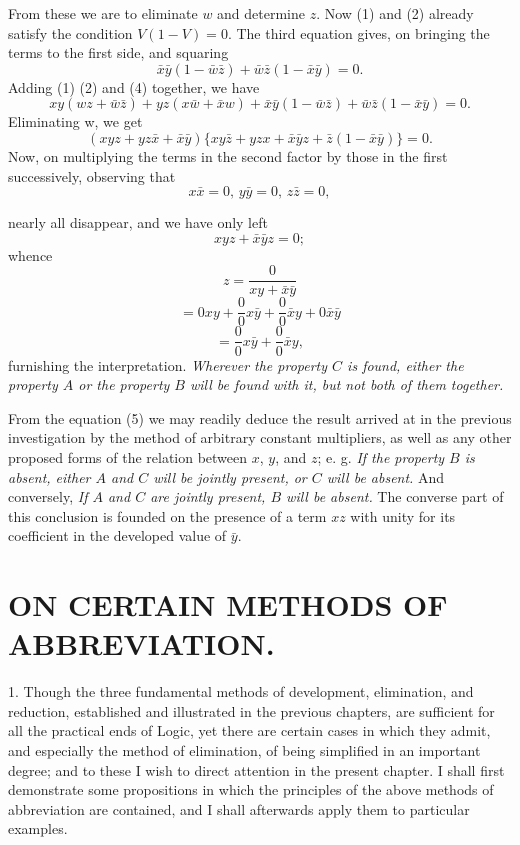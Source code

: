 \documentclass[oneside]{book}
\begin{document}
From these we are to eliminate $w$ and determine $z$. Now (1)
and (2) already satisfy the condition $V(1 - V) = 0$. The third
equation gives, on bringing the terms to the first side, and
squaring
\begin{equation}
\bar{x}\bar{y} (1 -\bar{w}\bar{z}) + \bar{w}\bar{z}(1 - \bar{x}\bar{y}) = 0.
\end{equation}
Adding (1) (2) and (4) together, we have
\[
xy(wz + \bar{w}\bar{z}) + yz(x\bar{w} +\bar{x}w)+\bar{x}\bar{y}(1 - \bar{w}\bar{z}) + \bar{w}\bar{z}(1 - \bar{x}\bar{y}) = 0.
 \]
Eliminating w, we get
\[
(xyz + yz\bar{x} + \bar{x}\bar{y}) \{xy\bar{z} + yzx + \bar{x}\bar{y}z + \bar{z}(1 - \bar{x}\bar{y})\} = 0.
\]
Now, on multiplying the terms in the second factor by those in
the first successively, observing that
\[
x\bar{x} = 0\textrm{, }y\bar{y} = 0\textrm{, }z\bar{z} = 0,
\]

nearly all disappear, and we have only left
\begin{equation}
xyz + \bar{x}\bar{y}z = 0;
\end{equation}
whence
\[
z = \frac{0}{xy+\bar{x}\bar{y}}
\]
\[
= 0xy + \frac{0}{0}x\bar{y} + \frac{0}{0}\bar{x}y + 0\bar{x}\bar{y}
\]
\[
= \frac{0}{0}x\bar{y} + \frac{0}{0}\bar{x}y,
\]
furnishing the interpretation. \textit{Wherever the property $C$ is found,
either the property $A$ or the property $B$ will be found with it, but
not both of them together.}

From the equation (5) we may readily deduce the result arrived
at in the previous investigation by the method of arbitrary
constant multipliers, as well as any other proposed forms of the
relation between $x$, $y$, and $z$; e. g. \textit{If the property $B$ is absent,
either $A$ and $C$ will be jointly present, or $C$ will be absent.} And
conversely, \textit{If $A$ and $C$ are jointly present, $B$ will be absent.}
The converse part of this conclusion is founded on the presence
of a term $xz$ with unity for its coefficient in the developed value
of $\bar{y}$.

\chapter[METHODS OF ABBREVIATION]
{\large ON CERTAIN METHODS OF ABBREVIATION.}

1. Though the three fundamental methods of development,
elimination, and reduction, established and illustrated in
the previous chapters, are sufficient for all the practical ends of
Logic, yet there are certain cases in which they admit, and especially
the method of elimination, of being simplified in an important
degree; and to these I wish to direct attention in the
present chapter. I shall first demonstrate some propositions in
which the principles of the above methods of abbreviation are
contained, and I shall afterwards apply them to particular examples.
\end{document}
